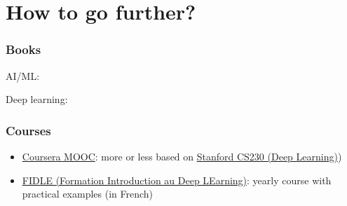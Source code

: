 \section{How to go further?}

\begin{frame}
  \frametitle{Books}

  \nocite{*}

  AI/ML:
  \printbibliography[category=general]

  Deep learning:
  \printbibliography[category=deep_learning]
\end{frame}

\begin{frame}
  \frametitle{Courses}

  \begin{itemize}
  \item
    \href{https://www.coursera.org/specializations/machine-learning-introduction}{Coursera
    MOOC}:
    more or less based on \href{https://cs230.stanford.edu/}{Stanford CS230 (Deep Learning)})
  \item \href{https://fidle.cnrs.fr/}{FIDLE (Formation Introduction au Deep LEarning)}: yearly course with practical examples (in French)
  \end{itemize}
\end{frame}
